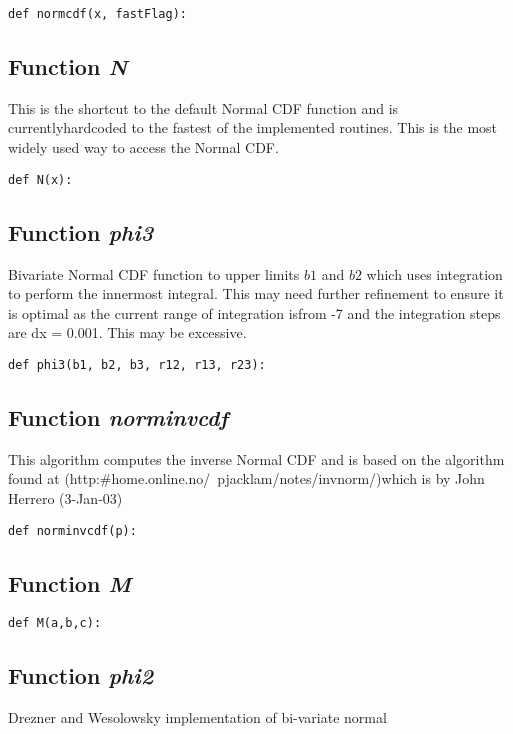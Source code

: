 \documentclass[twoside,11pt]{book}
\begin{document}
\begin{lstlisting}
def normcdf(x, fastFlag):
\end{lstlisting}

\subsection{Function {\it N}}
This is the shortcut to the default Normal CDF function and is currentlyhardcoded to the fastest of the implemented routines. This is the most widely used way to access the Normal CDF. 

\begin{lstlisting}
def N(x):
\end{lstlisting}

\subsection{Function {\it phi3}}
Bivariate Normal CDF function to upper limits $b1$ and $b2$ which uses integration to perform the innermost integral. This may need further refinement to ensure it is optimal as the current range of integration isfrom -7 and the integration steps are dx = 0.001. This may be excessive. 

\begin{lstlisting}
def phi3(b1, b2, b3, r12, r13, r23):
\end{lstlisting}

\subsection{Function {\it norminvcdf}}
This algorithm computes the inverse Normal CDF and is based on the algorithm found at (http:\#home.online.no/~pjacklam/notes/invnorm/)which is by John Herrero (3-Jan-03) 

\begin{lstlisting}
def norminvcdf(p):
\end{lstlisting}

\subsection{Function {\it M}}


\begin{lstlisting}
def M(a,b,c):
\end{lstlisting}

\subsection{Function {\it phi2}}
Drezner and Wesolowsky implementation of bi-variate normal 
\end{document}
